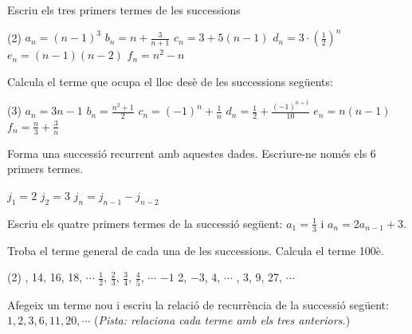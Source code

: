 \begin{extrapage}
	
\setcounter{myenumi}{0}
\vso

\begin{mylist}
	
	\item Escriu els tres primers termes de les successions
	\begin{tasks}(2)
		\task $a_n = (n-1)^3$
		\task $b_n = n + \frac{3}{n+1}$
		\task $c_n = 3 + 5(n-1)$
		\task $d_n = 3 \cdot \left( \frac{1}{2} \right)^n$
		\task $e_n = (n-1)(n-2)$
		\task $f_n = n^2 - n$
	\end{tasks}
	
	\item Calcula el terme que ocupa el lloc desè de les successions següents:
	\begin{tasks}(3)
		\task $a_n = 3n-1$
		\task $b_n = \frac{n^2+1}{2}$
		\task $c_n = (-1)^n + \frac{1}{n}$
		\task $d_n=\frac{1}{2}+\frac{(-1)^{n+1}}{10}$
		\task $e_n = n (n-1)$
		\task $f_n = \frac{n}{3} + \frac{3}{n}$
	\end{tasks}
	
	\item Forma una successió recurrent amb aquestes dades. Escriure-ne només els 6 primers termes.
	
	\qquad $j_1=2$  \qquad $j_2=3$  \qquad $j_n=j_{n-1} - j_{n-2}$  
 	
	\item Escriu els quatre primers termes de la successió següent: $a_1=\frac{1}{3}$ i $a_n = 2 a_{n-1}+3$.
	
	\item Troba el terme general de cada una de les successions. Calcula el terme 100è.
	\begin{tasks}(2)
		, 14, 16, 18, $\cdots$
		\task $\frac{1}{2}$, $\frac{2}{3}$, $\frac{3}{4}$, $\frac{4}{5}$, $\cdots$
		\task $-1$ 2, $-3$, 4, $\cdots$
		, 3, 9, 27, $\cdots$
	\end{tasks}
	
	\item Afegeix un terme nou i escriu la relació de recurrència de la successió següent: 
	$1, 2, 3, 6, 11, 20, \cdots$  (\textit{Pista: relaciona cada terme amb els tres anteriors.})
	

\end{mylist}
\end{extrapage}
